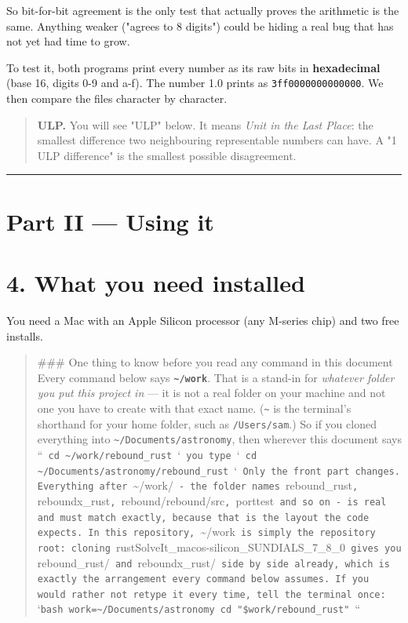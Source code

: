 \documentclass[11pt]{article}
\begin{document}
So bit-for-bit agreement is the only test that actually proves the arithmetic is the same. Anything weaker ("agrees to 8 digits") could be hiding a real bug that has not yet had time to grow.

To test it, both programs print every number as its raw bits in \textbf{hexadecimal} (base 16, digits 0-9 and a-f). The number 1.0 prints as \texttt{3ff0000000000000}. We then compare the files character by character.

\begin{quote}
\textbf{ULP.} You will see "ULP" below. It means \emph{Unit in the Last Place}: the smallest difference two neighbouring representable numbers can have. A "1 ULP difference" is the smallest possible disagreement.
\end{quote}

\bigskip\hrule\bigskip

\clearpage
\section*{Part II --- Using it}

\section{4. What you need installed}

You need a Mac with an Apple Silicon processor (any M-series chip) and two free installs.

\begin{quote}
\#\#\# One thing to know before you read any command in this document  Every command below says \textbf{\texttt{\textasciitilde{}/work}}. That is a stand-in for \emph{whatever folder you put this project in} --- it is not a real folder on your machine and not one you have to create with that exact name. (\texttt{\textasciitilde{}} is the terminal's shorthand for your home folder, such as \texttt{/Users/sam}.)  So if you cloned everything into \texttt{\textasciitilde{}/Documents/astronomy}, then wherever this document says  ``\texttt{ cd \textasciitilde{}/work/rebound\_rust }`\texttt{  you type  }`\texttt{ cd \textasciitilde{}/Documents/astronomy/rebound\_rust }`\texttt{  Only the front part changes. Everything after }\textasciitilde{}/work/\texttt{ - the folder names }rebound\_rust\texttt{, }reboundx\_rust\texttt{, }rebound/rebound/src\texttt{, }porttest\texttt{ and so on - is real and must match exactly, because that is the layout the code expects.  In this repository, }\textasciitilde{}/work\texttt{ is simply the repository root: cloning }rustSolveIt\_macos-silicon\_SUNDIALS\_7\_8\_0\texttt{ gives you }rebound\_rust/\texttt{ and }reboundx\_rust/\texttt{ side by side already, which is exactly the arrangement every command below assumes.  If you would rather not retype it every time, tell the terminal once:  }`\texttt{bash work=\textasciitilde{}/Documents/astronomy cd "\$work/rebound\_rust" }``
\end{quote}
\end{document}
